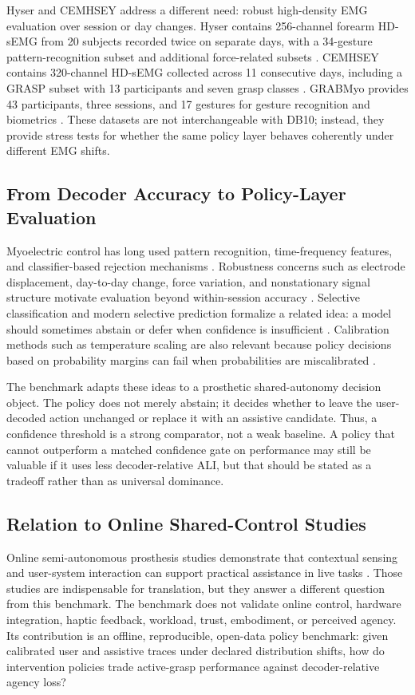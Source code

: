 \documentclass[journal]{IEEEtran}
\begin{document}
Hyser and CEMHSEY address a different need: robust high-density EMG evaluation over session or day changes. Hyser contains 256-channel forearm HD-sEMG from 20 subjects recorded twice on separate days, with a 34-gesture pattern-recognition subset and additional force-related subsets \cite{Jiang2021Hyser,Jiang2023HyserPhysioNet}. CEMHSEY contains 320-channel HD-sEMG collected across 11 consecutive days, including a GRASP subset with 13 participants and seven grasp classes \cite{Yang2025CEMHSEY}. GRABMyo provides 43 participants, three sessions, and 17 gestures for gesture recognition and biometrics \cite{Pradhan2022GRABMyo,Jiang2024GRABMyoPhysioNet}. These datasets are not interchangeable with DB10; instead, they provide stress tests for whether the same policy layer behaves coherently under different EMG shifts.

\subsection{From Decoder Accuracy to Policy-Layer Evaluation}
Myoelectric control has long used pattern recognition, time-frequency features, and classifier-based rejection mechanisms \cite{Englehart1999TimeFrequency,Scheme2011Selective}. Robustness concerns such as electrode displacement, day-to-day change, force variation, and nonstationary signal structure motivate evaluation beyond within-session accuracy \cite{Hargrove2006Electrode,Jiang2012Focus}. Selective classification and modern selective prediction formalize a related idea: a model should sometimes abstain or defer when confidence is insufficient \cite{Scheme2011Selective,Geifman2019SelectiveNet}. Calibration methods such as temperature scaling are also relevant because policy decisions based on probability margins can fail when probabilities are miscalibrated \cite{Guo2017Calibration}.

The benchmark adapts these ideas to a prosthetic shared-autonomy decision object. The policy does not merely abstain; it decides whether to leave the user-decoded action unchanged or replace it with an assistive candidate. Thus, a confidence threshold is a strong comparator, not a weak baseline. A policy that cannot outperform a matched confidence gate on performance may still be valuable if it uses less decoder-relative ALI, but that should be stated as a tradeoff rather than as universal dominance.

\subsection{Relation to Online Shared-Control Studies}
Online semi-autonomous prosthesis studies demonstrate that contextual sensing and user-system interaction can support practical assistance in live tasks \cite{Castro2022Depth}. Those studies are indispensable for translation, but they answer a different question from this benchmark. The benchmark does not validate online control, hardware integration, haptic feedback, workload, trust, embodiment, or perceived agency. Its contribution is an offline, reproducible, open-data policy benchmark: given calibrated user and assistive traces under declared distribution shifts, how do intervention policies trade active-grasp performance against decoder-relative agency loss?
\end{document}
